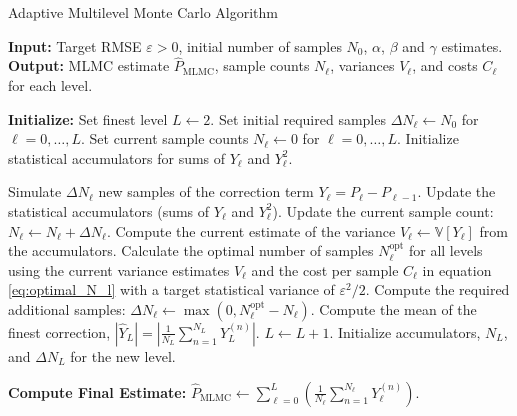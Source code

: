 \begin{algorithm}
\caption{Adaptive Multilevel Monte Carlo Algorithm}
\label{alg:mlmc_detailed}
\begin{algorithmic}[1]
\Statex \textbf{Input:} Target RMSE $\varepsilon > 0$, initial number of samples
$N_0$, $\alpha$, $\beta$ and $\gamma$ estimates.
\Statex \textbf{Output:} MLMC estimate $\hat{P}_{\mathrm{MLMC}}$, sample counts
$N_\ell$, variances $V_\ell$, and costs $C_\ell$ for each level.

\State \textbf{Initialize:}
\State Set finest level $L \gets 2$.
\State Set initial required samples $\Delta N_\ell \gets N_0$ for $\ell = 0, 
\dots, L$.
\State Set current sample counts $N_\ell \gets 0$ for $\ell = 0, \dots, L$.
\State Initialize statistical accumulators for sums of $Y_\ell$ and $Y_\ell^2$.

\State
{} 
    \State {}
            \State Simulate $\Delta N_\ell$ new samples of the correction term 
            $Y_\ell = P_\ell - P_{\ell-1}$.
            \State Update the statistical accumulators (sums of $Y_\ell$ and 
            $Y_\ell^2$).
            \State Update the current sample count: $N_\ell \gets N_\ell + 
            \Delta N_\ell$.
        \EndIf
    \EndFor
    \State
    \State {}
        \State Compute the current estimate of the variance $V_\ell \gets 
        \mathbb{V}[Y_\ell]$ from the accumulators.
    \EndFor
    \State Calculate the optimal number of samples $N_\ell^{\text{opt}}$ for all 
    levels using the current variance estimates $V_\ell$ and the cost per sample 
    $C_\ell$ in equation \eqref{eq:optimal_N_l} with a target statistical variance of $\varepsilon^2/2$.
    \State Compute the required additional samples: $\Delta N_\ell \gets \max(0, 
    N_\ell^{\text{opt}} - N_\ell)$.
    \State
    \State {}
     
        \State Compute the mean of the finest correction, $|\hat{Y}_L| = 
        \left|\frac{1}{N_L}\sum_{n=1}^{N_L}Y_L^{(n)}\right|$.
         
            \State $L \gets L+1$. 
            \State Initialize accumulators, $N_L$, and $\Delta N_L$ for the 
            new level.
        \EndIf
    \EndIf
\EndWhile

\State
\State \textbf{Compute Final Estimate:} $\hat{P}_{\mathrm{MLMC}} \gets 
\sum_{\ell=0}^L \left( \frac{1}{N_\ell} \sum_{n=1}^{N_\ell} Y_\ell^{(n)} \right)$.
\end{algorithmic}
\end{algorithm}
